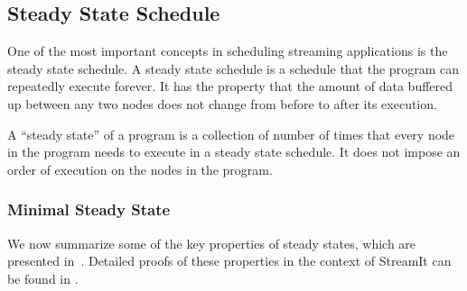 \subsection{Steady State Schedule}
\label{sec:steady-state}

One of the most important concepts in scheduling streaming
applications is the steady state schedule.  A steady state schedule is
a schedule that the program can repeatedly execute forever.  It has
the property that the amount of data buffered up between any two nodes
does not change from before to after its execution.

A ``steady state'' of a program is a collection of number of times
that every node in the program needs to execute in a steady state
schedule.  It does not impose an order of execution on the nodes in
the program.
\begin{comment}
Not every {\StreamIt} program has a steady state schedule.  It is
possible for a program to have unbalanced production and
consumption of data in {\splitjoins} and {\feedbackloops}. The
amount of data buffered continually increases, and cannot be
reduced, thus making it impossible to create a steady state
schedule for them.  It is also possible that a {\feedbackloop}
does not have enough data buffered up internally in order to
complete execution of a full steady state, and thus deadlocks.
Programs without a valid steady state schedule are not considered
valid {\StreamIt} programs. In other words, all valid {\StreamIt}
programs have a steady state schedule.
\end{comment}

\subsubsection{Minimal Steady State}

We now summarize some of the key properties of steady states, which
are presented in~\cite{lee87static}.  Detailed proofs of these
properties in the context of StreamIt can be found in
\cite{karczma-thesis}.



